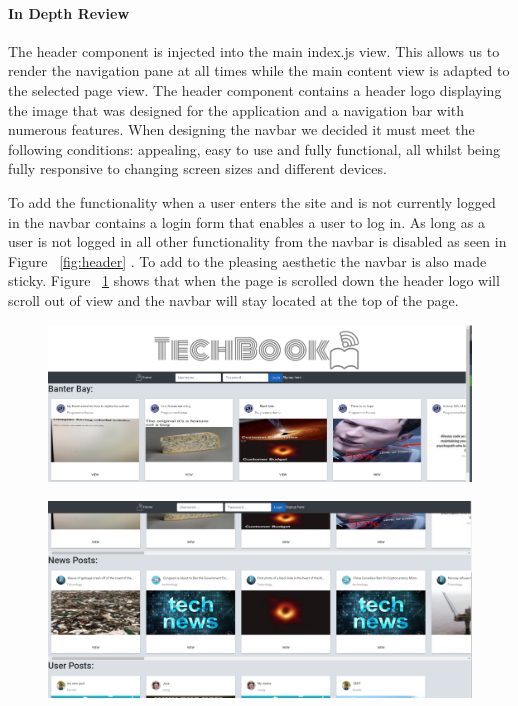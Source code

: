 \paragraph{In Depth Review\newline}
The header component is injected into the main index.js view. This allows us to render the navigation pane at all times while the main content view is adapted to the selected page view. The header component contains a header logo displaying the image that was designed for the application and a navigation bar with numerous features. When designing the navbar we decided it must meet the following conditions: appealing, easy to use and fully functional, all whilst being fully responsive to changing screen sizes and different devices.

To add the functionality when a user enters the site and is not currently logged in the navbar contains a login form that enables a user to log in. As long as a user is not logged in all other functionality from the navbar is disabled as seen in Figure ~\ref{fig:header} . To add to the pleasing aesthetic the navbar is also made sticky. Figure ~\ref{fig:headerStick} shows that when the page is scrolled down the header logo will scroll out of view and the navbar will stay located at the top of the page.

\begin{figure}[H]
\centering
\begin{minipage}{.5\textwidth}
  \centering
  \includegraphics[width=.9\linewidth]{img/ui/headerPC.PNG}
  \label{fig:header}
\end{minipage}%
\begin{minipage}{.5\textwidth}
  \centering
  \includegraphics[width=.9\linewidth]{img/ui/headerpcsticky.PNG}
  \label{fig:headerStick}
\end{minipage}
\end{figure}

